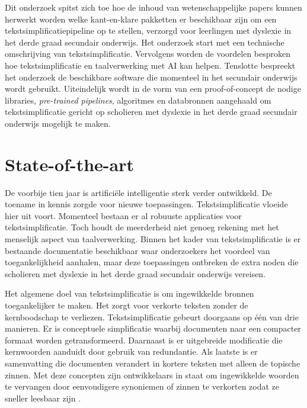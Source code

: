 
Dit onderzoek spitst zich toe hoe de inhoud van wetenschappelijke papers kunnen herwerkt worden welke kant-en-klare pakketten er beschikbaar zijn om een tekstsimplificatiepipeline op te stellen, verzorgd voor leerlingen met dyslexie in het derde graad secundair onderwijs. Het onderzoek start met een technische omschrijving van tekstsimplificatie. Vervolgens worden de voordelen besproken hoe tekstsimplificatie en taalverwerking met AI kan helpen. Tenslotte bespreekt het onderzoek de beschikbare software die momenteel in het secundair onderwijs wordt gebruikt. Uiteindelijk wordt in de vorm van een proof-of-concept de nodige libraries, \textit{pre-trained pipelines}, algoritmes en databronnen aangehaald om tekstsimplificatie gericht op scholieren met dyslexie in het derde graad secundair onderwijs mogelijk te maken. 


\section{State-of-the-art}%
\label{sec:state-of-the-art}

De voorbije tien jaar is artificiële intelligentie sterk verder ontwikkeld. De toename in kennis zorgde voor nieuwe toepassingen. Tekstsimplificatie vloeide hier uit voort. Momenteel bestaan er al robuuste applicaties voor tekstsimplificatie. Toch houdt de meerderheid niet genoeg rekening met het menselijk aspect van taalverwerking. Binnen het kader van tekstsimplificatie is er bestaande documentatie beschikbaar waar onderzoekers het voordeel van toegankelijkheid aanhalen, maar deze toepassingen ontbreken de extra noden die scholieren met dyslexie in het derde graad secundair onderwijs vereisen.

Het algemene doel van tekstsimplificatie is om ingewikkelde bronnen toegankelijker te maken. Het zorgt voor verkorte teksten zonder de kernboodschap te verliezen. Tekstsimplificatie gebeurt doorgaans op één van drie manieren. Er is conceptuele simplificatie waarbij documenten naar een compacter formaat worden getransformeerd. Daarnaast is er uitgebreide modificatie die kernwoorden aanduidt door gebruik van redundantie. Als laatste is er samenvatting die documenten verandert in kortere teksten met alleen de topische zinnen. Met deze concepten zijn ontwikkelaars in staat om ingewikkelde woorden te vervangen door eenvoudigere synoniemen of zinnen te verkorten zodat ze sneller leesbaar zijn \autocite{Siddharthan2014}.


